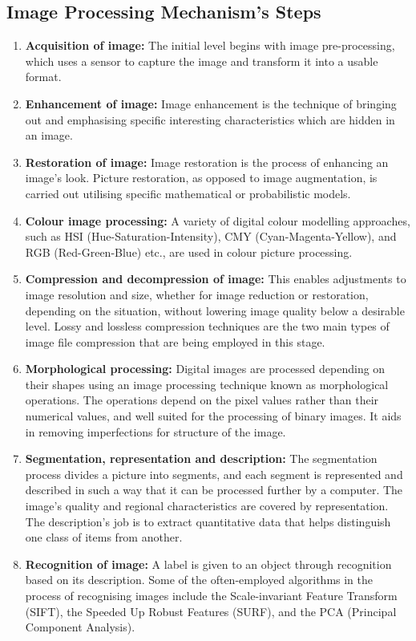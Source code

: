 \subsection*{Image Processing Mechanism's Steps}
\begin{enumerate}
  \item \textbf{Acquisition of image:} The initial level begins with image pre-processing, which uses a sensor to capture the image and transform it into a usable format.

  \item \textbf{Enhancement of image:} Image enhancement is the technique of bringing out and emphasising specific interesting characteristics which are hidden in an image.

  \item \textbf{Restoration of image:} Image restoration is the process of enhancing an image's look. Picture restoration, as opposed to image augmentation, is carried out utilising specific mathematical or probabilistic models.

  \item \textbf{Colour image processing:} A variety of digital colour modelling approaches, such as HSI (Hue-Saturation-Intensity), CMY (Cyan-Magenta-Yellow), and RGB (Red-Green-Blue) etc., are used in colour picture processing.

  \item \textbf{Compression and decompression of image:} This enables adjustments to image resolution and size, whether for image reduction or restoration, depending on the situation, without lowering image quality below a desirable level. Lossy and lossless compression techniques are the two main types of image file compression that are being employed in this stage.

  \item \textbf{Morphological processing:} Digital images are processed depending on their shapes using an image processing technique known as morphological operations. The operations depend on the pixel values rather than their numerical values, and well suited for the processing of binary images. It aids in removing imperfections for structure of the image.

  \item \textbf{Segmentation, representation and description:} The segmentation process divides a picture into segments, and each segment is represented and described in such a way that it can be processed further by a computer. The image's quality and regional characteristics are covered by representation. The description's job is to extract quantitative data that helps distinguish one class of items from another.

  \item \textbf{Recognition of image:} A label is given to an object through recognition based on its description. Some of the often-employed algorithms in the process of recognising images include the Scale-invariant Feature Transform (SIFT), the Speeded Up Robust Features (SURF), and the PCA (Principal Component Analysis).
\end{enumerate} %

